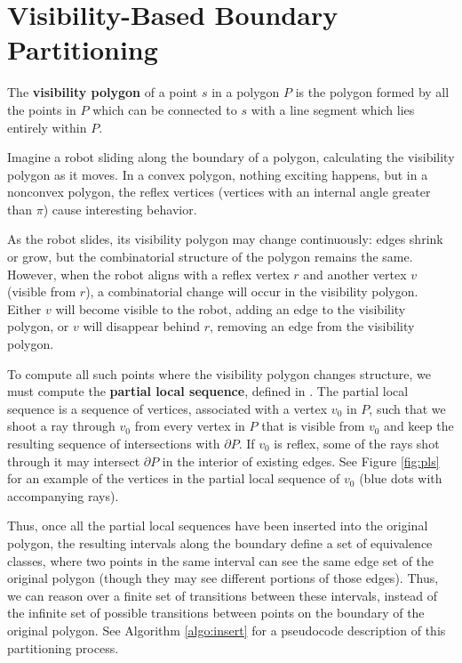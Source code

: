 \documentclass[]{styles/svproc}  %
\begin{document}
\section{Visibility-Based Boundary Partitioning} \label{sec:partition}

\begin{definition}
The \textbf{visibility polygon} of a point $s$ in a polygon $P$ is the polygon
formed by all the points in $P$ which can be connected to $s$ with a line
segment which lies entirely within $P$.
\end{definition}

Imagine a robot sliding along the boundary of a polygon, calculating 
the visibility polygon as it moves. In a convex polygon, nothing exciting 
happens, but in a nonconvex polygon, the reflex vertices (vertices with an
internal angle greater than $\pi$) cause interesting
behavior.

As the robot slides, its visibility polygon may change continuously: edges
shrink or grow, but the combinatorial structure of the polygon remains the same.
However, when the robot aligns with a reflex vertex $r$ and another vertex $v$ (visible
from $r$), a combinatorial change will occur in the visibility polygon. Either 
$v$ will become visible to the robot, adding an edge to the visibility 
polygon, or $v$ will disappear behind $r$, removing an edge from the visibility polygon.

To compute all such points where the visibility polygon changes structure, we
must compute the \textbf{partial local sequence}, defined in \cite{rourke_viz}.
The partial local sequence is a sequence of vertices, associated with a vertex
$v_0$ in $P$, such that we shoot a ray through $v_0$ from every vertex in $P$
that is visible from $v_0$ and keep the resulting sequence of intersections with
$\partial P$. If $v_0$ is reflex, some of the rays shot through it may intersect
$\partial P$ in the interior of existing edges. See Figure \ref{fig:pls} for an
example of the vertices in the partial local sequence of $v_0$ (blue dots with
accompanying rays).

Thus, once all the partial local sequences have been inserted into the original
polygon, the resulting intervals along the boundary define a set of equivalence
classes, where two points in the same interval can see the same edge set of the
original polygon (though they may see different portions of those edges). Thus,
we can reason over a finite set of transitions between these intervals, instead
of the infinite set of possible transitions between points on the boundary of
the original polygon. See Algorithm \ref{algo:insert} for a pseudocode
description of this partitioning process.
\end{document}
